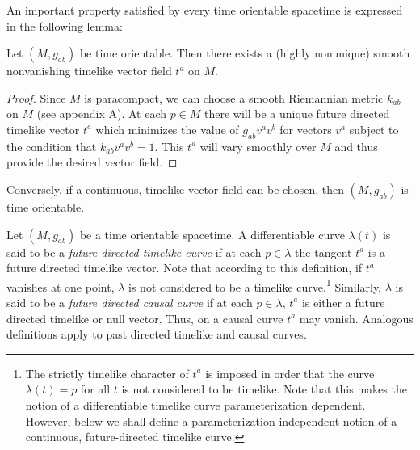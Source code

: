 

An important property satisfied by every time orientable spacetime is expressed in
the following lemma:

\begin{lemma}\label{lem:8.1.1}
Let \((M,g_{ab})\) be time orientable. Then there exists a (highly nonunique) smooth
nonvanishing timelike vector field \(t^a\) on \(M\).
\end{lemma}
\begin{proof}
Since \(M\) is paracompact, we can choose a smooth Riemannian metric \(k_{ab}\) on
\(M\) (see appendix A). At each \(p\in M\) there will be a unique future directed
timelike vector \(t^a\) which minimizes the value of \(g_{ab}v^av^b\) for vectors
\(v^a\) subject to the condition that \(k_{ab}v^av^b=1\). This \(t^a\) will vary
smoothly over \(M\) and thus provide the desired vector field.
\end{proof}

Conversely, if a continuous, timelike vector field can be chosen, then \((M,g_{ab})\)
is time orientable.

Let \((M,g_{ab})\) be a time orientable spacetime. A differentiable curve
\(\lambda(t)\) is said to be a \emph{future directed timelike curve} if at each
\(p\in\lambda\) the tangent \(t^a\) is a future directed timelike vector. Note that
according to this definition, if \(t^a\) vanishes at one point, \(\lambda\) is not
considered to be a timelike curve.\footnote{The strictly timelike character of
\(t^a\) is imposed in order that the curve \(\lambda(t)=p\) for all \(t\) is not
considered to be timelike. Note that this makes the notion of a differentiable
timelike curve parameterization dependent. However, below we shall define a
parameterization-independent notion of a continuous, future-directed timelike curve.}
Similarly, \(\lambda\) is said to be a \emph{future directed causal curve} if at each
\(p\in\lambda\), \(t^a\) is either a future directed timelike or null vector. Thus,
on a causal curve \(t^a\) may vanish. Analogous definitions apply to past directed
timelike and causal curves.

